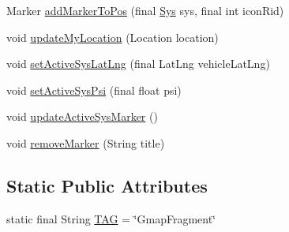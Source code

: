 \begin{DoxyCompactItemize}
\item 
Marker \hyperlink{classpt_1_1lsts_1_1asa_1_1fragments_1_1GmapFragment_a037e4fafbb7e73f97452251217cdc0d6}{add\+Marker\+To\+Pos} (final \hyperlink{classpt_1_1lsts_1_1asa_1_1sys_1_1Sys}{Sys} sys, final int icon\+Rid)
\item 
void \hyperlink{classpt_1_1lsts_1_1asa_1_1fragments_1_1GmapFragment_a266cbf3ee5f8ab35236e498d6e47226b}{update\+My\+Location} (Location location)
\item 
void \hyperlink{classpt_1_1lsts_1_1asa_1_1fragments_1_1GmapFragment_a96c0fb5bd26e96479d540b4736dd6120}{set\+Active\+Sys\+Lat\+Lng} (final Lat\+Lng vehicle\+Lat\+Lng)
\item 
void \hyperlink{classpt_1_1lsts_1_1asa_1_1fragments_1_1GmapFragment_a57526cc5349c5f47f95e899342f6f486}{set\+Active\+Sys\+Psi} (final float psi)
\item 
void \hyperlink{classpt_1_1lsts_1_1asa_1_1fragments_1_1GmapFragment_aa5a7c28538b8d866457b90e09d07b98b}{update\+Active\+Sys\+Marker} ()
\item 
void \hyperlink{classpt_1_1lsts_1_1asa_1_1fragments_1_1GmapFragment_a4e3659d51dbab32e35d8f10b13e253e2}{remove\+Marker} (String title)
\end{DoxyCompactItemize}
\subsection*{Static Public Attributes}
\begin{DoxyCompactItemize}
\item 
static final String \hyperlink{classpt_1_1lsts_1_1asa_1_1fragments_1_1GmapFragment_a82229b8ab24e3f6c61eb2a0da23d51a9}{T\+A\+G} = \char`\"{}Gmap\+Fragment\char`\"{}
\end{DoxyCompactItemize}
